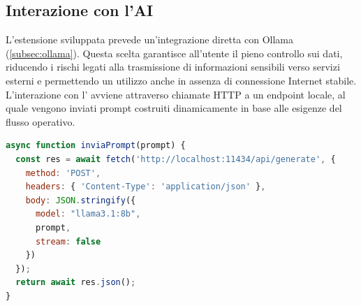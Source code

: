 \subsection{Interazione con l'AI}
\noindent L’estensione sviluppata prevede un’integrazione diretta con Ollama (\ref{subsec:ollama}). Questa scelta garantisce all’utente il pieno controllo sui dati, riducendo i rischi legati alla trasmissione di informazioni sensibili verso servizi esterni e permettendo un utilizzo anche in assenza di connessione Internet stabile. L’interazione con l’ avviene attraverso chiamate HTTP a un endpoint locale, al quale vengono inviati prompt costruiti dinamicamente in base alle esigenze del flusso operativo.

\begin{lstlisting}[language=JavaScript, caption={Funzione di interazione con Ollama}]
async function inviaPrompt(prompt) {
  const res = await fetch('http://localhost:11434/api/generate', {
    method: 'POST',
    headers: { 'Content-Type': 'application/json' },
    body: JSON.stringify({
      model: "llama3.1:8b",
      prompt,
      stream: false
    })
  });
  return await res.json();
}
\end{lstlisting}

